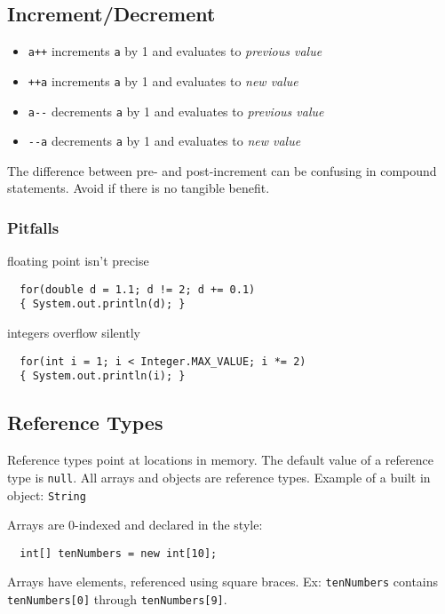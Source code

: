 \documentclass[11pt,letterpaper]{amsart}
\begin{document}
\subsection{Increment/Decrement}

\begin{itemize}
\item \texttt{a++} increments \texttt{a} by 1 and evaluates to \emph{previous value}
\item \texttt{++a} increments \texttt{a} by 1 and evaluates to \emph{new value}
\item \texttt{a-{}-} decrements \texttt{a} by 1 and evaluates to \emph{previous value}
\item \texttt{-{}-a} decrements \texttt{a} by 1 and evaluates to \emph{new value}
\end{itemize}

The difference between pre- and post-increment can be confusing in
compound statements. Avoid if there is no tangible benefit.

\subsubsection{Pitfalls}

floating point isn't precise
\begin{verbatim}
  for(double d = 1.1; d != 2; d += 0.1)
  { System.out.println(d); }
\end{verbatim}

integers overflow silently 
\begin{verbatim}
  for(int i = 1; i < Integer.MAX_VALUE; i *= 2)
  { System.out.println(i); }
\end{verbatim}

\subsection{Reference Types}

Reference types point at locations in memory. The default value of a
reference type is \texttt{null}. All arrays and objects are reference
types. Example of a built in object: \texttt{String}

Arrays are 0-indexed and declared in the style:
\begin{verbatim}
  int[] tenNumbers = new int[10];
\end{verbatim}
Arrays have elements, referenced using square braces. Ex:
\texttt{tenNumbers} contains \texttt{tenNumbers[0]} through
\texttt{tenNumbers[9]}.
\end{document}
